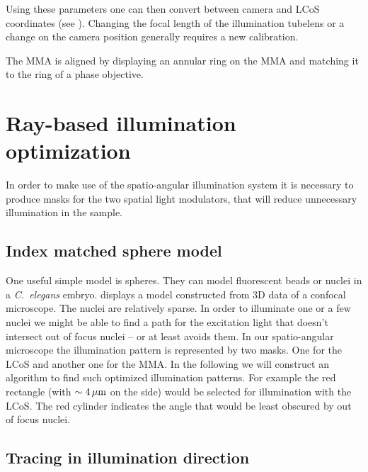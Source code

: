 Using these parameters one can then convert between camera and LCoS
coordinates (see ). Changing the focal
length of the illumination tubelens or a change on the camera position
generally requires a new calibration.


The MMA is aligned by displaying an annular ring on the MMA and
matching it to the ring of a phase objective.


\section{Ray-based illumination optimization}
In order to make use of the spatio-angular illumination system it is
necessary to produce masks for the two spatial light modulators, that
will reduce unnecessary illumination in the sample.

\subsection{Index matched sphere model}
\label{sec:shadow-map}
One useful simple model is spheres. They can model fluorescent beads
or nuclei in a \emph{C.~elegans} embryo.  displays
a model constructed from 3D data of a confocal microscope. The nuclei
are relatively sparse. In order to illuminate one or a few nuclei we
might be able to find a path for the excitation light that doesn't
intersect out of focus nuclei -- or at least avoids them. In our
spatio-angular microscope the illumination pattern is represented by
two masks. One for the LCoS and another one for the MMA. In the
following we will construct an algorithm to find such optimized
illumination patterns. For example the red rectangle (with
$\sim\unit[4]{\mu m}$ on the side) would be selected for illumination
with the LCoS. The red cylinder indicates the angle that would be
least obscured by out of focus nuclei.


\subsection{Tracing in illumination direction}

